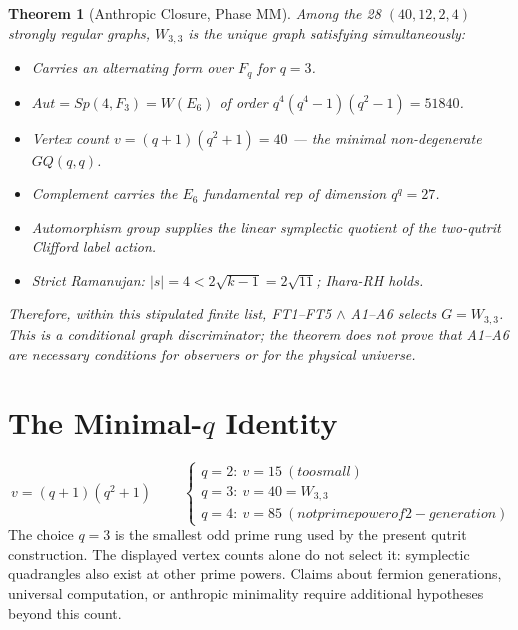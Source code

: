 \documentclass[12pt,a4paper]{article}
\def\mathbb#1{#1}%
\def\mathrm#1{#1}%
\def\textbf#1{#1}%
\def\text#1{#1}%
\newtheorem{theorem}{Theorem}[section]
\theoremstyle{definition}
\newcommand{\GQ}{\mathrm{GQ}}
\newcommand{\Sp}{\mathrm{Sp}}
\newcommand{\Aut}{\mathrm{Aut}}
\newcommand{\FF}{\mathbb{F}}
\begin{document}
\begin{theorem}[Anthropic Closure, Phase MM]
Among the 28 $(40,12,2,4)$ strongly regular graphs, $W_{3,3}$ is the
unique graph satisfying simultaneously:
\begin{itemize}[leftmargin=2em]
\item[\textbf{A1.}] Carries an alternating form over $\FF_q$ for $q=3$.
\item[\textbf{A2.}] $\Aut = \Sp(4,\FF_3) = W(E_6)$ of order
$q^4(q^4-1)(q^2-1)=51840$.
\item[\textbf{A3.}] Vertex count $v=(q+1)(q^2+1)=40$ --- the
\emph{minimal} non-degenerate $\GQ(q,q)$.
\item[\textbf{A4.}] Complement carries the $E_6$ fundamental rep of
dimension $q^q=27$.
\item[\textbf{A5.}] Automorphism group supplies the linear symplectic
quotient of the two-qutrit Clifford label action.
\item[\textbf{A6.}] Strict Ramanujan: $|s|=4 < 2\sqrt{k-1}=2\sqrt{11}$;
Ihara-RH holds.
\end{itemize}
Therefore, within this stipulated finite list,
FT1--FT5 $\wedge$ A1--A6 selects $G=W_{3,3}$.  This is a conditional
graph discriminator; the theorem does not prove that A1--A6 are
necessary conditions for observers or for the physical universe.
\end{theorem}

\section*{The Minimal-$q$ Identity}
\[
\boxed{\ v = (q+1)(q^2+1)\ }\qquad
\begin{cases}q=2:\ v=15\ (\text{too small})\\ q=3:\ v=40=W_{3,3}\\ q=4:\ v=85\ (\text{not prime power of 2-generation})\end{cases}
\]
The choice $q=3$ is the smallest odd prime rung used by the present
qutrit construction.  The displayed vertex counts alone do not select
it: symplectic quadrangles also exist at other prime powers.  Claims
about fermion generations, universal computation, or anthropic
minimality require additional hypotheses beyond this count.
\end{document}
